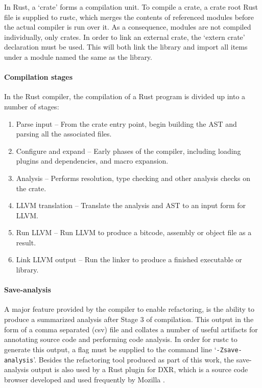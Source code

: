 In Rust, a `crate' forms a compilation unit. To compile a crate, a crate root Rust file is supplied to rustc, which merges the contents of referenced modules before the actual compiler is run over it. As a consequence, modules are not compiled individually, only crates. In order to link an external crate, the `extern crate' declaration must be used. This will both link the library and import all items under a module named the same as the library. 

\paragraph{Compilation stages}
In the Rust compiler, the compilation of a Rust program is divided up into a number of stages:

\begin{enumerate}
\item Parse input -- From the crate entry point, begin building the AST and parsing all the associated files.
\item Configure and expand -- Early phases of the compiler, including loading plugins and dependencies, and macro expansion.
\item Analysis -- Performs resolution, type checking and other analysis checks on the crate.
\item LLVM translation -- Translate the analysis and AST to an input form for LLVM.
\item Run LLVM -- Run LLVM to produce a bitcode, assembly or object file as a result.
\item Link LLVM output -- Run the linker to produce a finished executable or library.
\end{enumerate}

\paragraph{Save-analysis}
A major feature provided by the compiler to enable refactoring, is the ability to produce a summarized analysis after Stage 3 of compilation. This output in the form of a comma separated (csv) file and collates a number of useful artifacts for annotating source code and performing code analysis. In order for rustc to generate this output, a flag must be supplied to the command line `{\verb|-Zsave-analysis|}'. Besides the refactoring tool produced as part of this work, the save-analysis output is also used by a Rust plugin for DXR, which is a source code browser developed and used frequently by Mozilla \cite{dxr15}.  

